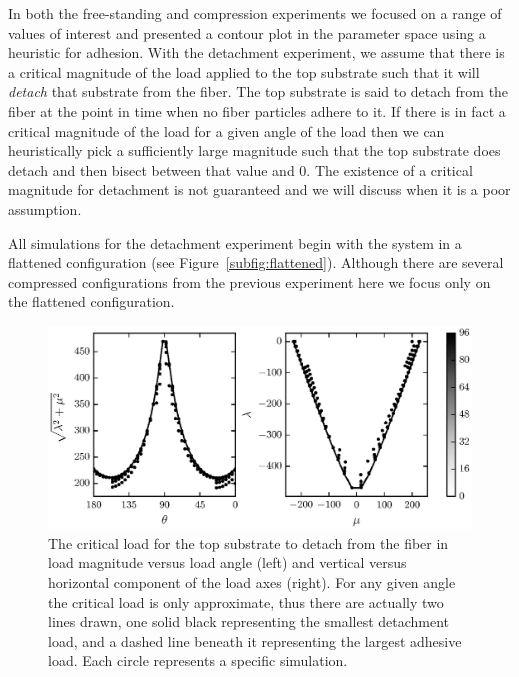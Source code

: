 In both the free-standing and compression experiments we focused on a range of values of interest and presented a contour plot in the parameter space using a heuristic for adhesion. With the detachment experiment,  we assume that there is a critical magnitude of the load applied to the top substrate such that it will \textit{detach} that substrate from the fiber. The top substrate is said to detach from the fiber at the point in time when no fiber particles adhere to it. If there is in fact a critical magnitude of the load for a given angle of the load then we can heuristically pick a sufficiently large magnitude such that the top substrate does detach and then bisect between that value and $0$. The existence of a critical magnitude for detachment is not guaranteed and we will discuss when it is a poor assumption.

All simulations for the detachment experiment begin with the system in a flattened configuration (see Figure~\ref{subfig:flattened}). Although there are several compressed configurations from the previous experiment here we focus only on the flattened configuration.
   
   \begin{figure}[t]
      \begin{center}
         \includegraphics{./fig/ch3/pull/ref/grid.eps}
      \end{center}      
      \caption{The critical load for the top substrate to detach from the fiber in load magnitude versus load angle (left) and vertical versus horizontal component of the load axes (right). For any given angle the critical load is only approximate, thus there are actually two lines drawn, one solid black representing the smallest detachment load, and a dashed line beneath it representing the largest adhesive load. Each circle represents a specific simulation.
      \label{fig:pull:ref}}
   \end{figure}

